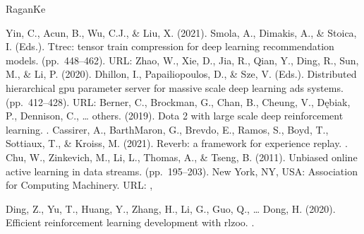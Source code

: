 \documentclass[letterpaper,10pt,english]{sphinxmanual}
\begin{document}
\begin{sphinxthebibliography}{Ragan\sphinxhyphen{}Ke}
\begin{footnote}[69]
%
\end{footnote}
\sphinxAtStartPar
Yin, C., Acun, B., Wu, C.\sphinxhyphen{}J., \& Liu, X. (2021). Smola, A., Dimakis, A., \& Stoica, I. (Eds.). Tt\sphinxhyphen{}rec: tensor train compression for deep learning recommendation models.  (pp. 448–462). URL: 
\sphinxAtStartPar
Zhao, W., Xie, D., Jia, R., Qian, Y., Ding, R., Sun, M., \& Li, P. (2020). Dhillon, I., Papailiopoulos, D., \& Sze, V. (Eds.). Distributed hierarchical gpu parameter server for massive scale deep learning ads systems.  (pp. 412–428). URL: 
\sphinxAtStartPar
Berner, C., Brockman, G., Chan, B., Cheung, V., Dębiak, P., Dennison, C., … others. (2019). Dota 2 with large scale deep reinforcement learning. .
\sphinxAtStartPar
Cassirer, A., Barth\sphinxhyphen{}Maron, G., Brevdo, E., Ramos, S., Boyd, T., Sottiaux, T., \& Kroiss, M. (2021). Reverb: a framework for experience replay. .
\sphinxAtStartPar
Chu, W., Zinkevich, M., Li, L., Thomas, A., \& Tseng, B. (2011). Unbiased online active learning in data streams.  (pp. 195–203). New York, NY, USA: Association for Computing Machinery. URL: , %
\begin{footnote}[80]\sphinxAtStartFootnote
{}
%
\end{footnote}
\sphinxAtStartPar
Ding, Z., Yu, T., Huang, Y., Zhang, H., Li, G., Guo, Q., … Dong, H. (2020). Efficient reinforcement learning development with rlzoo. .

\end{sphinxthebibliography}
\end{document}
